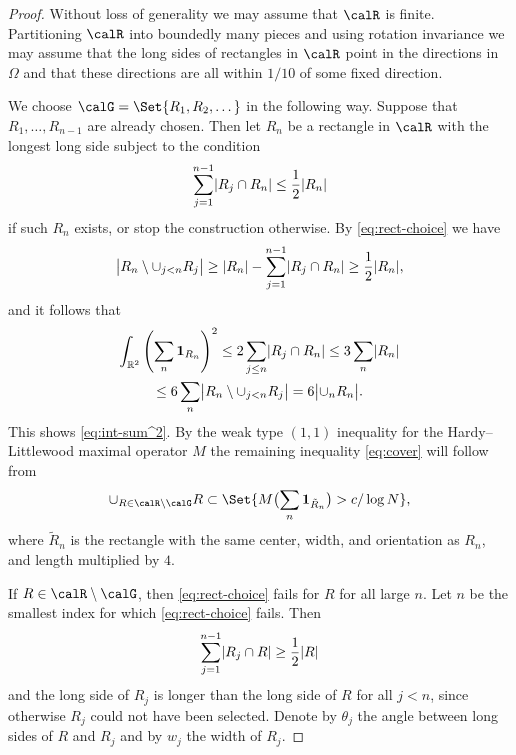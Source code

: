 \begin{proof}
Without loss of generality we may assume that $\calR$ is finite.
Partitioning $\calR$ into boundedly many pieces and using rotation invariance we may assume that the long sides of rectangles in $\calR$ point in the directions in $\Omega$ and that these directions are all within $1/10$ of some fixed direction.

We choose $\calG = \Set{ R_{1}, R_{2}, \dotsc }$ in the following way.
Suppose that $R_{1},\dotsc,R_{n-1}$ are already chosen.
Then let $R_{n}$ be a rectangle in $\calR$ with the longest long side subject to the condition
\begin{equation}
\label{eq:rect-choice}
\sum_{j=1}^{n-1} \abs{ R_{j} \cap R_{n} }
\leq
\frac{1}{2} \abs{ R_{n} }
\end{equation}
if such $R_{n}$ exists, or stop the construction otherwise.
By \eqref{eq:rect-choice} we have
\[
\abs[\big]{ R_{n} \setminus \cup_{j<n} R_{j} }
\geq
\abs{ R_{n} } - \sum_{j=1}^{n-1} \abs{ R_{j} \cap R_{n} }
\geq
\frac{1}{2} \abs{ R_{n} },
\]
and it follows that
\begin{multline}
\int_{\R^{2}} \left( \sum_{n} \one_{R_{n}} \right)^{2}
\leq
2 \sum_{j \leq n} \abs{ R_{j} \cap R_{n} }
\leq
3 \sum_{n} \abs{ R_{n} }\\
\leq
6 \sum_{n} \abs[\big]{ R_{n} \setminus \cup_{j<n} R_{j} }
=
6 \abs[\big]{ \cup_{n} R_{n} }.
\end{multline}
This shows \eqref{eq:int-sum^2}.
By the weak type $(1,1)$ inequality for the Hardy--Littlewood maximal operator $M$ the remaining inequality \eqref{eq:cover} will follow from
\begin{equation}
\cup_{R \in \calR \setminus \calG} R
\subset \Set{ M \bigl( \sum_{n} \one_{\tilde{R}_{n}} \bigr) > c / \log N},
\end{equation}
where $\tilde{R}_{n}$ is the rectangle with the same center, width, and orientation as $R_{n}$, and length multiplied by $4$.

If $R \in \calR\setminus\calG$, then \eqref{eq:rect-choice} fails for $R$ for all large $n$.
Let $n$ be the smallest index for which \eqref{eq:rect-choice} fails.
Then
\[
\sum_{j=1}^{n-1} \abs{ R_{j} \cap R }
\geq
\frac{1}{2} \abs{ R }
\]
and the long side of $R_{j}$ is longer than the long side of $R$ for all $j < n$, since otherwise $R_{j}$ could not have been selected.
Denote by $\theta_{j}$ the angle between long sides of $R$ and $R_{j}$ and by $w_{j}$ the width of $R_{j}$.


\end{proof}
